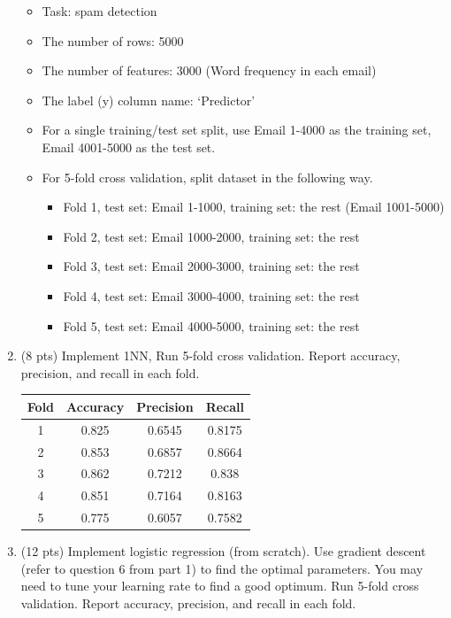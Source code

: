 \documentclass[a4paper]{article}
\theoremstyle{definition}
\newenvironment{soln}{
    \leavevmode\color{blue}\ignorespaces
}{}
\begin{document}
\begin{enumerate}
	\begin{itemize}
		\item Task: spam detection
		\item The number of rows: 5000
		\item The number of features: 3000 (Word frequency in each email)
		\item The label (y) column name: `Predictor'
		\item For a single training/test set split, use Email 1-4000 as the training set, Email 4001-5000 as the test set.
		\item For 5-fold cross validation, split dataset in the following way.
		\begin{itemize}
			\item Fold 1, test set: Email 1-1000, training set: the rest (Email 1001-5000)
			\item Fold 2, test set: Email 1000-2000, training set: the rest
			\item Fold 3, test set: Email 2000-3000, training set: the rest
			\item Fold 4, test set: Email 3000-4000, training set: the rest
			\item Fold 5, test set: Email 4000-5000, training set: the rest			
		\end{itemize}
	\end{itemize}
	
	\item (8 pts) Implement 1NN, Run 5-fold cross validation. Report accuracy, precision, and recall in each fold.
	
	\begin{soln}
		\begin{center}
			\begin{tabular}{|c|c|c|c|}
				\hline
				Fold & Accuracy & Precision & Recall \\
				\hline
				1  &  0.825  &  0.6545  &  0.8175  \\
				2  &  0.853  &  0.6857  &  0.8664  \\
				3  &  0.862  &  0.7212  &  0.838  \\
				4  &  0.851  &  0.7164  &  0.8163  \\
				5  &  0.775  &  0.6057  &  0.7582  \\
				\hline
			\end{tabular}
		\end{center}
	\end{soln}
	
	\item (12 pts) Implement logistic regression (from scratch). Use gradient descent (refer to question 6 from part 1) to find the optimal parameters. You may need to tune your learning rate to find a good optimum. Run 5-fold cross validation. Report accuracy, precision, and recall in each fold.
	

\end{enumerate}
\end{document}
